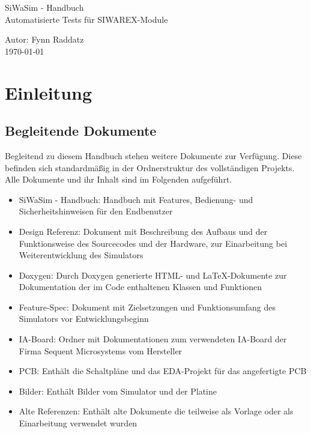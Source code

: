 \documentclass[12pt, a4paper]{report}
\begin{document}
    \begin{figure}
        \centering
    \end{figure}
    
   \vspace*{1.2cm}
   \begin{center}
       {\huge SiWaSim - Handbuch}\\[0.8cm]
       \large{Automatisierte Tests für SIWAREX-Module}\\[0.5cm]
	
   \end{center}
   \vfill
   \begin{flushleft}
       \large{Autor: Fynn Raddatz}\\
       \today
       \thispagestyle{empty}
   \end{flushleft}
   \newpage
   \tableofcontents
   \clearpage
   \pagestyle{fancy}

\chapter{Einleitung}
\section{Begleitende Dokumente}
Begleitend zu diesem Handbuch stehen weitere Dokumente zur Verfügung. Diese befinden sich standardmäßig in der Ordnerstruktur des vollständigen Projekts. Alle Dokumente und ihr Inhalt sind im Folgenden aufgeführt.
\begin{itemize}
\item SiWaSim - Handbuch: Handbuch mit Features, Bedienung- und Sicherheitshinweisen für den Endbenutzer
\item Design Referenz: Dokument mit Beschreibung des Aufbaus und der Funktionsweise des Sourcecodes und der Hardware, zur Einarbeitung bei Weiterentwicklung des Simulators
\item Doxygen: Durch Doxygen generierte HTML- und \LaTeX -Dokumente zur Dokumentation der im Code enthaltenen Klassen und Funktionen
\item Feature-Spec: Dokument mit Zielsetzungen und Funktionsumfang des Simulators vor Entwicklungsbeginn
\item IA-Board: Ordner mit Dokumentationen zum verwendeten IA-Board der Firma Sequent Microsystems vom Hersteller
\item PCB: Enthält die Schaltpläne und das EDA-Projekt für das angefertigte PCB
\item Bilder: Enthält Bilder vom Simulator und der Platine
\item Alte Referenzen: Enthält alte Dokumente die teilweise als Vorlage oder als Einarbeitung verwendet wurden
\end{itemize}
\end{document}

